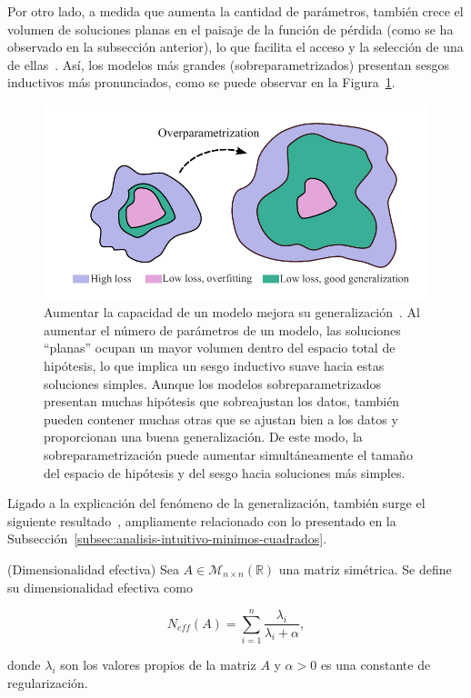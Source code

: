 Por otro lado, a medida que aumenta la cantidad de parámetros, también crece el volumen de soluciones planas en el paisaje de la función de pérdida (como se ha observado en la subsección anterior), lo que facilita el acceso y la selección de una de ellas~\cite{Huang2020}. Así, los modelos más grandes (sobreparametrizados) presentan sesgos inductivos más pronunciados, como se puede observar en la Figura~\ref{fig:overparametrization}.\newline

\begin{figure}[h]
    \centering
    \includegraphics[width=0.5\linewidth]{img/overparametrization.png}
    \caption[Aumentar la capacidad de un modelo mejora su generalización~\cite{Wilson2025}.]{Aumentar la capacidad de un modelo mejora su generalización~\cite{Wilson2025}. Al aumentar el número de parámetros de un modelo, las soluciones ``planas'' ocupan un mayor volumen dentro del espacio total de hipótesis, lo que implica un sesgo inductivo suave hacia estas soluciones simples. Aunque los modelos sobreparametrizados presentan muchas hipótesis que sobreajustan los datos, también pueden contener muchas otras que se ajustan bien a los datos y proporcionan una buena generalización. De este modo, la sobreparametrización puede aumentar simultáneamente el tamaño del espacio de hipótesis y del sesgo hacia soluciones más simples.}\label{fig:overparametrization}
\end{figure}

Ligado a la explicación del fenómeno de la generalización, también surge el siguiente resultado~\cite{Maddox2020}, ampliamente relacionado con lo presentado en la Subsección~\ref{subsec:analisis-intuitivo-minimos-cuadrados}.

\begin{definicion}(Dimensionalidad efectiva)
    Sea $A \in \mathcal{M}_{n \times n}(\mathbb{R})$ una matriz simétrica. Se define su dimensionalidad efectiva como

    \[
        N_{eff}(A) = \sum_{i=1}^{n}\frac{\lambda_i}{\lambda_i + \alpha},
    \]

    donde $\lambda_i$ son los valores propios de la matriz $A$ y $\alpha > 0$ es una constante de regularización.
\end{definicion}


